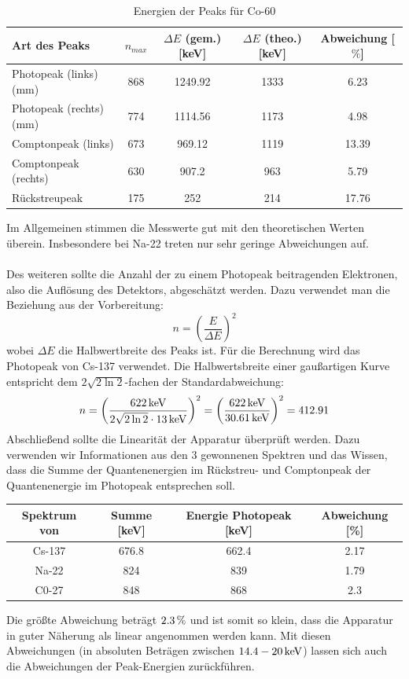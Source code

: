 \documentclass[a4paper,titlepage]{scrartcl}
\numberwithin{equation}{section}
\begin{document}
\begin{table}[H]
\begin{tabular}{l|c|c|c|c}
	Art des Peaks & $n_{max}$ & $\Delta E$ (gem.) [keV] & $\Delta E$ (theo.) [keV] & Abweichung [$\%$] \\
	\hline
	Photopeak (links) (mm) & 868 & 1249.92 & 1333 & 6.23\\
	Photopeak (rechts) (mm) & 774 & 1114.56 & 1173 & 4.98\\
	Comptonpeak (links) & 673 & 969.12 & 1119 & 13.39\\
	Comptonpeak (rechts) & 630 & 907.2 & 963 & 5.79\\
	Rückstreupeak & 175 & 252 & 214 & 17.76\\
\end{tabular}
\caption{Energien der Peaks für Co-60}
\end{table}
Im Allgemeinen stimmen die Messwerte gut mit den theoretischen Werten überein. Insbesondere bei Na-22 treten nur sehr geringe Abweichungen auf.\\ \\
Des weiteren sollte die Anzahl der zu einem Photopeak beitragenden Elektronen, also die Auflösung des Detektors, abgeschätzt werden. Dazu verwendet man die Beziehung aus der Vorbereitung:
\begin{equation*}
n=\left(\frac{E}{\Delta E}\right)^2
\end{equation*}
wobei $\Delta E$ die Halbwertbreite des Peaks ist. Für die Berechnung wird das Photopeak von Cs-137 verwendet. Die Halbwertsbreite einer gaußartigen Kurve entspricht dem $2 \sqrt{2 \ln 2}$-fachen der Standardabweichung:
\begin{equation*}
n=\left(\frac{\unit[622]{keV}}{\unit[2 \sqrt{2 \ln 2} \cdot 13]{keV}}\right)^2=\left(\frac{\unit[622]{keV}}{\unit[30.61]{keV}}\right)^2=412.91
\end{equation*}
Abschließend sollte die Linearität der Apparatur überprüft werden. Dazu verwenden wir Informationen aus den 3 gewonnenen Spektren und das Wissen, dass die Summe der Quantenenergien im Rückstreu- und Comptonpeak der Quantenenergie im Photopeak entsprechen soll.
\begin{table}[H]
\begin{tabular}{c|c|c|c}
	Spektrum von & Summe [keV] & Energie Photopeak [keV] & Abweichung [\%]\\
	\hline
	Cs-137 & 676.8 & 662.4 & 2.17\\
	Na-22 & 824 & 839 & 1.79\\
	C0-27 & 848 & 868 & 2.3\\
\end{tabular}
\end{table}
Die größte Abweichung beträgt $\unit[2.3]{\%}$ und ist somit so klein, dass die Apparatur in guter Näherung als linear angenommen werden kann. Mit diesen Abweichungen (in absoluten Beträgen zwischen $\unit[14.4-20]{keV}$) lassen sich auch die Abweichungen der Peak-Energien zurückführen.
\end{document}
